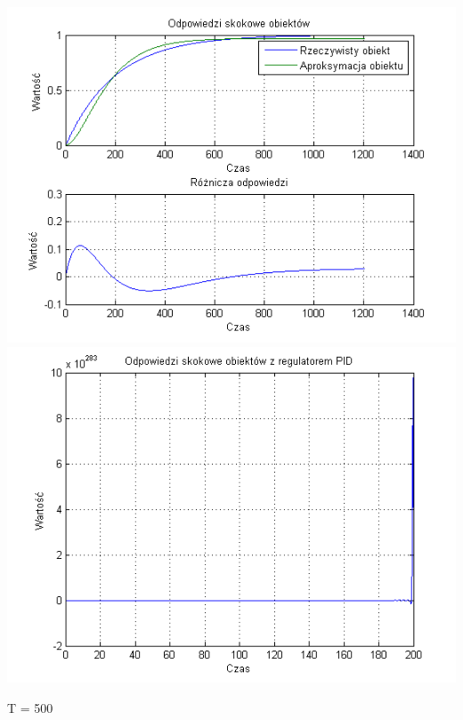 \documentclass[10pt,a4paper]{article}
\begin{document}
\begin{center}
\includegraphics[scale=1]{images/dwa/skrypt_37.png}\\
\includegraphics[scale=1]{images/dwa/skrypt_38.png}\\
\end{center}
\newpage
T = 500
\end{document}

